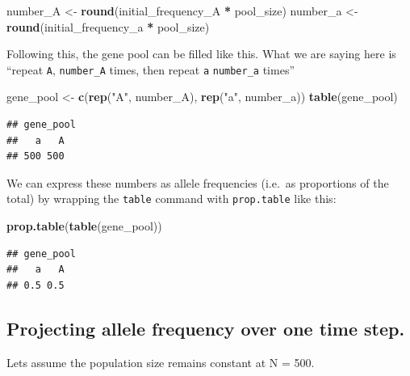 \documentclass[
  a4paper]{book}
\newenvironment{Shaded}{\begin{snugshade}}{\end{snugshade}}
\newcommand{\FunctionTok}[1]{\textcolor[rgb]{0.13,0.29,0.53}{\textbf{#1}}}
\newcommand{\NormalTok}[1]{#1}
\newcommand{\OtherTok}[1]{\textcolor[rgb]{0.56,0.35,0.01}{#1}}
\newcommand{\SpecialCharTok}[1]{\textcolor[rgb]{0.81,0.36,0.00}{\textbf{#1}}}
\newcommand{\StringTok}[1]{\textcolor[rgb]{0.31,0.60,0.02}{#1}}
\begin{document}
\begin{Shaded}
\begin{Highlighting}[]
\NormalTok{number\_A }\OtherTok{\textless{}{-}} \FunctionTok{round}\NormalTok{(initial\_frequency\_A }\SpecialCharTok{*}\NormalTok{ pool\_size)}
\NormalTok{number\_a }\OtherTok{\textless{}{-}} \FunctionTok{round}\NormalTok{(initial\_frequency\_a }\SpecialCharTok{*}\NormalTok{ pool\_size)}
\end{Highlighting}
\end{Shaded}

Following this, the gene pool can be filled like this.
What we are saying here is ``repeat \texttt{A}, \texttt{number\_A} times, then repeat \texttt{a} \texttt{number\_a} times''

\begin{Shaded}
\begin{Highlighting}[]
\NormalTok{gene\_pool }\OtherTok{\textless{}{-}} \FunctionTok{c}\NormalTok{(}\FunctionTok{rep}\NormalTok{(}\StringTok{"A"}\NormalTok{, number\_A), }\FunctionTok{rep}\NormalTok{(}\StringTok{"a"}\NormalTok{, number\_a))}
\FunctionTok{table}\NormalTok{(gene\_pool)}
\end{Highlighting}
\end{Shaded}

\begin{verbatim}
## gene_pool
##   a   A 
## 500 500
\end{verbatim}

We can express these numbers as allele frequencies (i.e.~as proportions of the total) by wrapping the \texttt{table} command with \texttt{prop.table} like this:

\begin{Shaded}
\begin{Highlighting}[]
\FunctionTok{prop.table}\NormalTok{(}\FunctionTok{table}\NormalTok{(gene\_pool))}
\end{Highlighting}
\end{Shaded}

\begin{verbatim}
## gene_pool
##   a   A 
## 0.5 0.5
\end{verbatim}

\subsection{Projecting allele frequency over one time step.}\label{projecting-allele-frequency-over-one-time-step.}

Lets assume the population size remains constant at N = 500.
\end{document}
